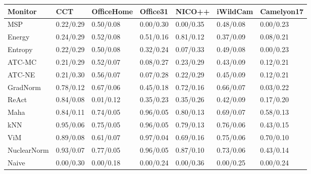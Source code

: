 \begin{tabularx}{\linewidth}{l *{6}{Y}}
\toprule
Monitor & CCT & OfficeHome & Office31 & NICO++ & iWildCam & Camelyon17 \\
\midrule
MSP & 0.22/0.29 & 0.50/0.08 & 0.00/0.30 & 0.00/0.35 & 0.48/0.08 & 0.00/0.23 \\
Energy & 0.24/0.29 & 0.52/0.08 & 0.51/0.16 & 0.81/0.12 & 0.37/0.09 & 0.08/0.21 \\
Entropy & 0.22/0.29 & 0.50/0.08 & 0.32/0.24 & 0.07/0.33 & 0.49/0.08 & 0.00/0.23 \\
ATC-MC & 0.21/0.29 & 0.52/0.07 & 0.08/0.27 & 0.23/0.29 & 0.43/0.09 & 0.12/0.21 \\
ATC-NE & 0.21/0.30 & 0.56/0.07 & 0.07/0.28 & 0.22/0.29 & 0.45/0.09 & 0.12/0.21 \\
GradNorm & 0.78/0.12 & 0.67/0.06 & 0.45/0.18 & 0.72/0.16 & 0.66/0.07 & 0.03/0.22 \\
ReAct & 0.84/0.08 & 0.01/0.12 & 0.35/0.23 & 0.35/0.26 & 0.42/0.09 & 0.17/0.20 \\
Maha & 0.84/0.11 & 0.74/0.05 & 0.96/0.05 & 0.80/0.13 & 0.69/0.07 & 0.58/0.13 \\
kNN & 0.95/0.06 & 0.75/0.05 & 0.96/0.05 & 0.79/0.13 & 0.76/0.06 & 0.43/0.15 \\
ViM & 0.89/0.08 & 0.61/0.07 & 0.97/0.04 & 0.69/0.16 & 0.75/0.06 & 0.70/0.10 \\
NuclearNorm & 0.93/0.07 & 0.77/0.05 & 0.96/0.05 & 0.87/0.10 & 0.73/0.06 & 0.43/0.14 \\
Naive & 0.00/0.30 & 0.00/0.18 & 0.00/0.24 & 0.00/0.36 & 0.00/0.25 & 0.00/0.24 \\
\bottomrule
\end{tabularx}
